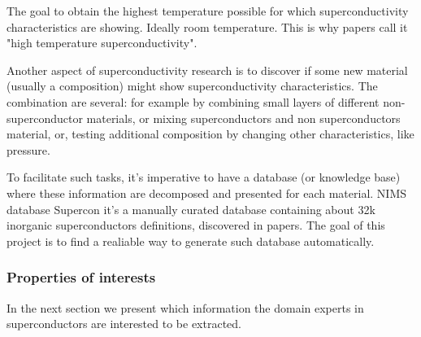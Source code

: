 \documentclass{article}
\begin{document}
The goal to obtain the highest temperature possible for which superconductivity characteristics are showing. Ideally room temperature. This is why papers call it "high temperature superconductivity". 

Another aspect of superconductivity research is to discover if some new material (usually a composition) might show superconductivity characteristics. The combination are several: for example by combining small layers of different non-superconductor materials, or mixing superconductors and non superconductors material, or, testing additional composition by changing other characteristics, like pressure. 

To facilitate such tasks, it's imperative to have a database (or knowledge base) where these information are decomposed and presented for each material. 
NIMS database Supercon it's a manually curated database containing about 32k inorganic superconductors definitions, discovered in papers. 
The goal of this project is to find a realiable way to generate such database automatically. 

\subsubsection{Properties of interests}
In the next section we present which information the domain experts in superconductors are interested to be extracted. 
\end{document}
